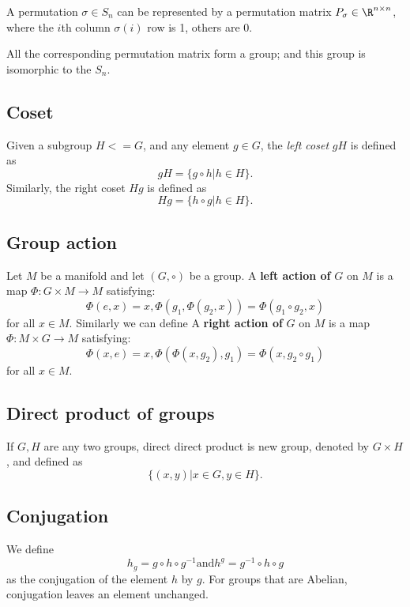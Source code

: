 \begin{refsection}
\begin{definition}
	A permutation $\sigma \in S_n$ can be represented by a permutation matrix $P_{\sigma} \in \R^{n\times n}$, where the $i$th column $\sigma(i)$ row is 1, others are 0. 
\end{definition}

\begin{remark}
	All the corresponding permutation matrix form a group; and this group is isomorphic to the $S_n$.
\end{remark}

\iffalse
\subsection{Coset}
\begin{definition}[coset]
Given a subgroup $H <= G$, and any element $g \in G$, the \emph{left coset} $gH$ is defined as $$gH=\{g\circ h | h \in H\}.$$ Similarly, the right coset $Hg$ is defined as $$Hg=\{h\circ g|h\in H\}.$$
\end{definition}






\subsection{Group action}
\begin{definition}
Let $M$ be a manifold and let $(G,\circ)$ be a group. A \textbf{left action of} $G$ on $M$ is a map $\Phi:G\times M \rightarrow M$ satisfying: $$\Phi(e,x)=x,\Phi(g_1,\Phi(g_2,x))=\Phi(g_1\circ g_2,x)$$ for all $x\in M$. Similarly we can define A \textbf{right action of} $G$ on $M$ is a map $\Phi:M\times G \rightarrow M$ satisfying: $$\Phi(x,e)=x,\Phi(\Phi(x,g_2),g_1)=\Phi(x,g_2\circ g_1)$$ for all $x\in M$.	
\end{definition}



\subsection{Direct product of groups}
\begin{definition}
If $G,H$ are any two groups, direct direct product is new group, denoted by $G\times H$, and defined as $$\{(x,y)|x\in G, y \in H\}.$$	
\end{definition}



\subsection{Conjugation}
\begin{definition}
We define
$$h_g = g \circ h \circ g^{-1} \text{and} h^g = g^{-1}\circ h \circ g$$
as the conjugation of the element $h$ by $g$. For groups that are Abelian, conjugation leaves an element unchanged. 	
\end{definition}



\end{refsection}
